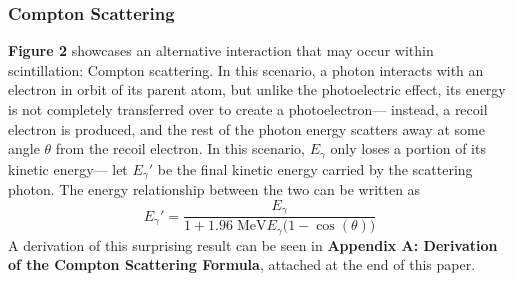 \documentclass[12pt]{article}
\begin{document}
\begin{multicols}{2}
\subsubsection{Compton Scattering}
\textbf{Figure 2} showcases an alternative interaction that may occur within
scintillation: Compton scattering. In this scenario, a photon interacts with
an electron in orbit of its parent atom, but unlike the photoelectric effect,
its energy is not completely transferred over to create a photoelectron---
instead, a recoil electron is produced, and the rest of the photon energy
scatters away at some angle $\theta$ from the recoil electron.
In this scenario, $E_\gamma$ only loses a portion of its kinetic energy---
let $E_\gamma'$ be the final kinetic energy carried by the scattering photon.
The energy relationship between the two can be written as
$$E_\gamma'=\frac{E_\gamma}{1+1.96\;\mathrm{MeV}E_\gamma\big(1-\cos(\theta)\big)}$$
A derivation of this surprising result can be seen in \textbf{Appendix A: Derivation of the Compton Scattering Formula},
attached at the end of this paper.


\end{multicols}
\end{document}
